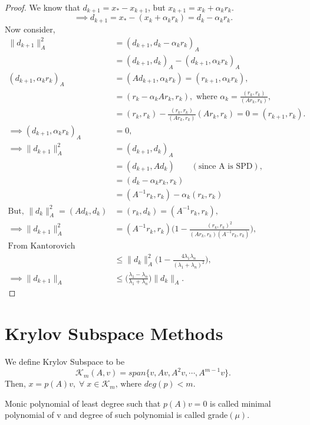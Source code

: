 \documentclass[10pt,a4paper]{article}
\begin{document}
\begin{proof}
We know that $d_{k+1}=x_*-x_{k+1}$, but $x_{k+1}=x_k+\alpha_k r_k.$
$$\implies d_{k+1}=x_*-(x_k+\alpha_k r_k)=d_k-\alpha_k r_k.$$
Now consider,
\begin{align*}
\|d_{k+1}\|^2_A &= (d_{k+1},d_k-\alpha_k r_k)_A \\
&= (d_{k+1},d_k)_A-(d_{k+1},\alpha_k r_k)_A \\
(d_{k+1},\alpha_k r_k)_A &= (Ad_{k+1},\alpha_k r_k) = (r_{k+1},\alpha_k r_k), \\
&= (r_k-\alpha_kAr_k,r_k),\text{ where }\alpha_k=\frac{(r_k,r_k)}{(Ar_k,r_k)}, \\
&= (r_k,r_k)-\frac{(r_k,r_k)}{(Ar_k,r_k)}(Ar_k,r_k) = 0 = (r_{k+1},r_k). \\
\implies (d_{k+1},\alpha_k r_k)_A &= 0, \\
\implies \|d_{k+1}\|^2_A &= (d_{k+1},d_k)_A \\
&= (d_{k+1},Ad_k) \qquad(\text{since A is SPD}),\\
&= (d_k-\alpha_k r_k,r_k) \\
&= (A^{-1}r_k,r_k)-\alpha_k(r_k,r_k) \\
\text{But, }\|d_k\|^2_A = (Ad_k,d_k) &= (r_k,d_k) = (A^{-1}r_k,r_k), \\
\implies \|d_{k+1}\|^2_A &= (A^{-1}r_k,r_k)\Big(1-\frac{(r_k,r_k)^2}{(Ar_k,r_k)(A^{-1}r_k,r_k)}\Big), \\
\text{From Kantorovich inequality,} \\
&\le \|d_{k}\|^2_A\Big(1-\frac{4\lambda_1\lambda_n}{(\lambda_1+\lambda_n)^2}\Big), \\
\implies \|d_{k+1}\|_A&\le\Big(\frac{\lambda_1-\lambda_n}{\lambda_1+\lambda_n}\Big)\|d_k\|_A.
\end{align*}
\end{proof}

\section{Krylov Subspace Methods}

We define Krylov Subspace to be 
$$\mathcal{K}_m(A,v)=span\{v,Av,A^2v,\cdots,A^{m-1}v\}.$$
Then, $x=p(A)v,\;\forall\;x\in\mathcal{K}_m\text{, where }deg(p)<m.$

\begin{mydef}
Monic polynomial of least degree such that $p(A)v=0$ is called minimal polynomial of v and degree of such polynomial is called grade$(\mu)$.
\end{mydef}
\end{document}
